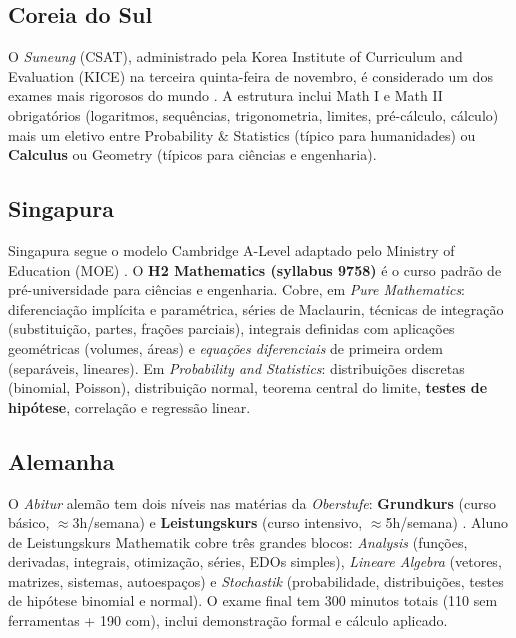 \documentclass[12pt,a4paper,oneside]{article}
\begin{document}
\subsection{Coreia do Sul}

O \emph{Suneung} (CSAT), administrado pela Korea Institute of
Curriculum and Evaluation (KICE) na terceira quinta-feira de
novembro, é considerado um dos exames mais rigorosos do mundo
\cite{ref:csat-wiki,ref:yocket-korean}. A estrutura inclui Math I e
Math II obrigatórios (logaritmos, sequências, trigonometria,
limites, pré-cálculo, cálculo) mais um eletivo entre Probability
\& Statistics (típico para humanidades) ou \textbf{Calculus} ou
Geometry (típicos para ciências e engenharia).

\subsection{Singapura}

Singapura segue o modelo Cambridge A-Level adaptado pelo Ministry
of Education (MOE) \cite{ref:seab-9758,ref:moe-h2math}. O
\textbf{H2 Mathematics (syllabus 9758)} é o curso padrão de
pré-universidade para ciências e engenharia. Cobre, em \emph{Pure
Mathematics}: diferenciação implícita e paramétrica, séries de
Maclaurin, técnicas de integração (substituição, partes, frações
parciais), integrais definidas com aplicações geométricas
(volumes, áreas) e \emph{equações diferenciais} de primeira ordem
(separáveis, lineares). Em \emph{Probability and Statistics}:
distribuições discretas (binomial, Poisson), distribuição normal,
teorema central do limite, \textbf{testes de hipótese}, correlação
e regressão linear.

\subsection{Alemanha}

O \emph{Abitur} alemão tem dois níveis nas matérias da
\emph{Oberstufe}: \textbf{Grundkurs} (curso básico, $\approx$3h/semana)
e \textbf{Leistungskurs} (curso intensivo, $\approx$5h/semana)
\cite{ref:nrw-mathematik,ref:eurydice-germany,ref:zdm-abitur}. Aluno
de Leistungskurs Mathematik cobre três grandes blocos:
\emph{Analysis} (funções, derivadas, integrais, otimização, séries,
EDOs simples), \emph{Lineare Algebra} (vetores, matrizes, sistemas,
autoespaços) e \emph{Stochastik} (probabilidade, distribuições,
testes de hipótese binomial e normal). O exame final tem 300
minutos totais (110 sem ferramentas + 190 com), inclui demonstração
formal e cálculo aplicado.
\end{document}
